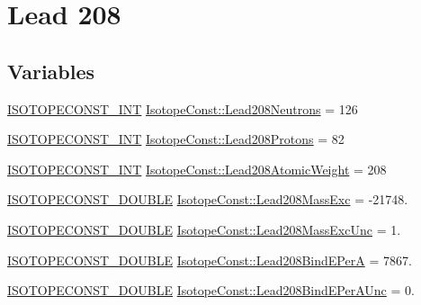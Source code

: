 \hypertarget{group___isotope_const-_lead-_pb208}{}\section{Lead 208}
\label{group___isotope_const-_lead-_pb208}
\subsection*{Variables}
\begin{DoxyCompactItemize}
\item 
\mbox{\hyperlink{group___isotope_const-_macros_ga5f18360b3e99483a35c32d789e62621c}{I\+S\+O\+T\+O\+P\+E\+C\+O\+N\+S\+T\+\_\+\+I\+NT}} \mbox{\hyperlink{group___isotope_const-_lead-_pb208_gaacc582aa1138ba32dbe0c180a3eb56d8}{Isotope\+Const\+::\+Lead208\+Neutrons}} = 126
\item 
\mbox{\hyperlink{group___isotope_const-_macros_ga5f18360b3e99483a35c32d789e62621c}{I\+S\+O\+T\+O\+P\+E\+C\+O\+N\+S\+T\+\_\+\+I\+NT}} \mbox{\hyperlink{group___isotope_const-_lead-_pb208_ga683b0f5638ee2a9a10815b38ec6228c5}{Isotope\+Const\+::\+Lead208\+Protons}} = 82
\item 
\mbox{\hyperlink{group___isotope_const-_macros_ga5f18360b3e99483a35c32d789e62621c}{I\+S\+O\+T\+O\+P\+E\+C\+O\+N\+S\+T\+\_\+\+I\+NT}} \mbox{\hyperlink{group___isotope_const-_lead-_pb208_ga1e927c2438d32b60260a7dd3896c1a32}{Isotope\+Const\+::\+Lead208\+Atomic\+Weight}} = 208
\item 
\mbox{\hyperlink{group___isotope_const-_macros_ga8f45a7272ce02c0b4c65c44636ed719a}{I\+S\+O\+T\+O\+P\+E\+C\+O\+N\+S\+T\+\_\+\+D\+O\+U\+B\+LE}} \mbox{\hyperlink{group___isotope_const-_lead-_pb208_gafc03048ce168ae9a2b828546b8e78f16}{Isotope\+Const\+::\+Lead208\+Mass\+Exc}} = -\/21748.
\item 
\mbox{\hyperlink{group___isotope_const-_macros_ga8f45a7272ce02c0b4c65c44636ed719a}{I\+S\+O\+T\+O\+P\+E\+C\+O\+N\+S\+T\+\_\+\+D\+O\+U\+B\+LE}} \mbox{\hyperlink{group___isotope_const-_lead-_pb208_ga78ad7262a529485abed5cd84271aedd9}{Isotope\+Const\+::\+Lead208\+Mass\+Exc\+Unc}} = 1.
\item 
\mbox{\hyperlink{group___isotope_const-_macros_ga8f45a7272ce02c0b4c65c44636ed719a}{I\+S\+O\+T\+O\+P\+E\+C\+O\+N\+S\+T\+\_\+\+D\+O\+U\+B\+LE}} \mbox{\hyperlink{group___isotope_const-_lead-_pb208_gad0c8918e83485f4ccee893f5544d06d7}{Isotope\+Const\+::\+Lead208\+Bind\+E\+PerA}} = 7867.
\item 
\mbox{\hyperlink{group___isotope_const-_macros_ga8f45a7272ce02c0b4c65c44636ed719a}{I\+S\+O\+T\+O\+P\+E\+C\+O\+N\+S\+T\+\_\+\+D\+O\+U\+B\+LE}} \mbox{\hyperlink{group___isotope_const-_lead-_pb208_gae1906151833658d4f1e7154d0fa8a69d}{Isotope\+Const\+::\+Lead208\+Bind\+E\+Per\+A\+Unc}} = 0.

\end{DoxyCompactItemize}
